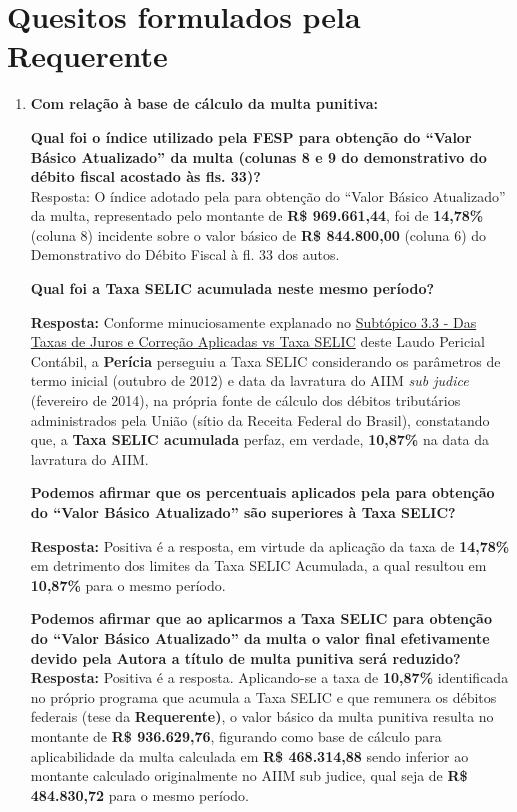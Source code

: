\flushleft
\hypertarget{apA}{\section{Quesitos formulados pela Requerente}}

\begin{enumerate}
    \item \textbf{Com relação à base de cálculo da multa punitiva:}

\textbf{Qual foi o índice utilizado pela FESP para obtenção do “Valor Básico Atualizado” da multa (colunas 8 e 9 do demonstrativo do débito fiscal acostado às fls. 33)?} \\
Resposta:	O índice adotado pela \textbf{\shortrequerida}para obtenção do “Valor Básico Atualizado” da multa, representado pelo montante de \textbf{R\$ 969.661,44}, foi de \textbf{14,78\%} (coluna 8) incidente sobre o valor básico de \textbf{R\$ 844.800,00} (coluna 6) do Demonstrativo do Débito Fiscal à fl. 33 dos autos.

\textbf{Qual foi a Taxa SELIC acumulada neste mesmo período?}

\textbf{Resposta:} Conforme minuciosamente explanado no \hyperlink{3.3}{Subtópico 3.3 - Das Taxas de Juros e Correção Aplicadas vs Taxa SELIC} deste Laudo Pericial Contábil, a \textbf{Perícia} perseguiu a Taxa SELIC considerando os parâmetros de termo inicial (outubro de 2012) e data da lavratura do AIIM \textit{sub judice} (fevereiro de 2014),
na própria fonte de cálculo dos débitos tributários administrados pela União (sítio da Receita Federal do Brasil), constatando que, a \textbf{Taxa SELIC acumulada} perfaz, em verdade, \textbf{10,87\%} na data da lavratura do AIIM.

\textbf{Podemos afirmar que os percentuais aplicados pela \shortrequerida para obtenção do “Valor Básico Atualizado” são superiores à Taxa SELIC?}

\textbf{Resposta:} Positiva é a resposta, em virtude da aplicação da taxa de \textbf{14,78\%} em detrimento dos limites da Taxa SELIC Acumulada, a qual resultou em \textbf{10,87\%} para o mesmo período.

\textbf{Podemos afirmar que ao aplicarmos a Taxa SELIC para obtenção do “Valor Básico Atualizado” da multa o valor final efetivamente devido pela Autora a título de multa punitiva será reduzido?}
\textbf{Resposta:} Positiva é a resposta. Aplicando-se a taxa de \textbf{10,87\%} identificada no próprio programa que acumula a Taxa SELIC e que remunera os débitos federais (tese da \textbf{Requerente)}, o valor básico da multa punitiva resulta no montante de \textbf{R\$ 936.629,76}, figurando como base de cálculo para aplicabilidade da multa calculada em \textbf{R\$ 468.314,88} sendo inferior ao montante calculado originalmente no AIIM sub judice, qual seja de \textbf{R\$ 484.830,72} para o mesmo período.


\end{enumerate}
